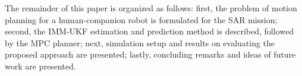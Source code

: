 \documentclass[letterpaper, 10 pt, conference]{ieeeconf}
\newcommand{\todohere}[1]{\hl{(\textbf{TODO:} #1)}}
\begin{document}
	
	
	The remainder of this paper is organized as follows:
	first, the problem of motion planning for a human-companion robot is formulated for the SAR mission;
	second, the IMM-UKF estimation and prediction method is described, followed by the MPC planner;
	next, simulation setup and results on evaluating the proposed approach are presented; 
	lastly, concluding remarks and ideas of future work are presented.
	
	
	
\end{document}
